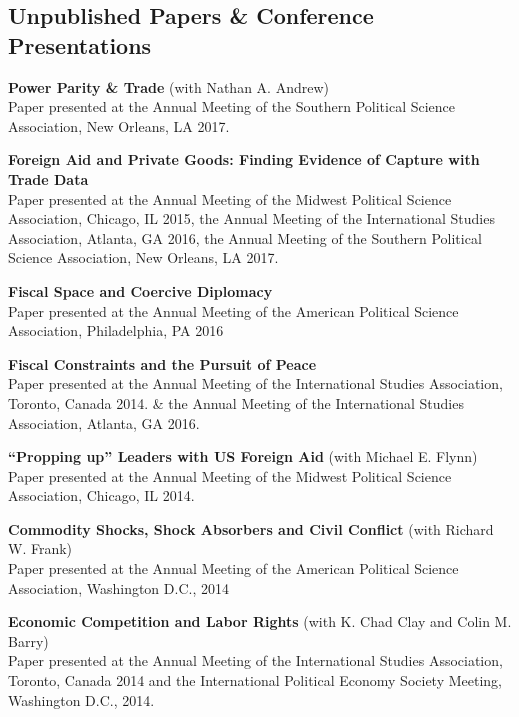 \documentclass[letterpaper]{article}
\renewenvironment{itemize}{
  \begin{list}{}{
    \setlength{\leftmargin}{1.75em}
  }
}{
  \end{list}
}
\begin{document}
\subsection*{Unpublished Papers \& Conference Presentations}
\begin{itemize}



\item \textbf{Power Parity \& Trade } (with Nathan A. Andrew)  \\
Paper presented at the Annual Meeting of the Southern Political Science Association, New Orleans, LA 2017. 


\item \textbf{Foreign Aid and Private Goods: Finding Evidence of Capture with Trade Data}  \\
Paper presented at the Annual Meeting of the Midwest Political Science Association, Chicago, IL 2015,  the Annual Meeting of the International Studies Association, Atlanta, GA 2016, the Annual Meeting of the Southern Political Science Association, New Orleans, LA 2017. 

\item \textbf{Fiscal Space and Coercive Diplomacy }  \\
Paper presented at the Annual Meeting of the American Political Science Association, Philadelphia, PA 2016

\item \textbf{Fiscal Constraints and the Pursuit of Peace }  \\
Paper presented at the Annual Meeting of the International Studies Association, Toronto, Canada 2014.  \& the Annual Meeting of the International Studies Association, Atlanta, GA 2016. 

\item \textbf{``Propping up'' Leaders with US Foreign Aid} (with Michael E. Flynn)  \\
Paper presented at the Annual Meeting of the Midwest Political Science Association, Chicago, IL  2014. 

\item \textbf{Commodity Shocks, Shock Absorbers and Civil Conflict} (with Richard W. Frank)\\
Paper presented at the Annual Meeting of the American Political Science Association, Washington D.C., 2014


\item \textbf{Economic Competition and Labor Rights} (with K. Chad Clay and Colin M. Barry)  \\
Paper presented at the Annual Meeting of the International Studies Association, Toronto, Canada  2014 and the International Political Economy Society Meeting, Washington D.C., 2014.


\end{itemize}
\end{document}
